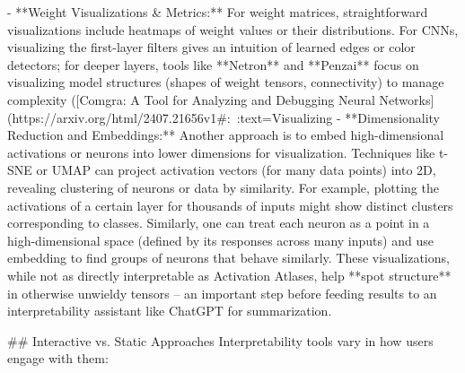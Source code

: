 - **Weight Visualizations & Metrics:** For weight matrices, straightforward visualizations include heatmaps of weight values or their distributions. For CNNs, visualizing the first-layer filters gives an intuition of learned edges or color detectors; for deeper layers, tools like **Netron** and **Penzai** focus on visualizing model structures (shapes of weight tensors, connectivity) to manage complexity ([Comgra: A Tool for Analyzing and Debugging Neural Networks](https://arxiv.org/html/2407.21656v1#:~:text=Visualizing%
- **Dimensionality Reduction and Embeddings:** Another approach is to embed high-dimensional activations or neurons into lower dimensions for visualization. Techniques like t-SNE or UMAP can project activation vectors (for many data points) into 2D, revealing clustering of neurons or data by similarity. For example, plotting the activations of a certain layer for thousands of inputs might show distinct clusters corresponding to classes. Similarly, one can treat each neuron as a point in a high-dimensional space (defined by its responses across many inputs) and use embedding to find groups of neurons that behave similarly. These visualizations, while not as directly interpretable as Activation Atlases, help **spot structure** in otherwise unwieldy tensors – an important step before feeding results to an interpretability assistant like ChatGPT for summarization.

## Interactive vs. Static Approaches
Interpretability tools vary in how users engage with them:

